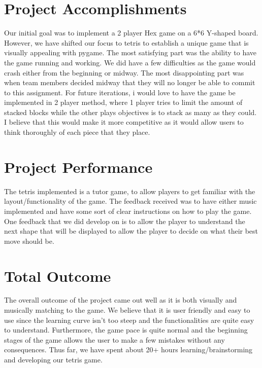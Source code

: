 \documentclass{article}
\begin{document}
\section{Project Accomplishments}
\quad Our initial goal was to implement a 2 player Hex game on a 6*6 Y-shaped board. However, we have shifted our focus to tetris to establish a unique game that is visually appealing with pygame. The most satisfying part was the ability to have the game running and working. We did have a few difficulties as the game would crash either from the beginning or midway. The most disappointing part was when team members decided midway that they will no longer be able to commit to this assignment. For future iterations, i would love to have the game be implemented in 2 player method, where 1 player tries to limit the amount of stacked blocks while the other plays objectives is to stack as many as they could. I believe that this would make it more competitive as it would allow users to think thoroughly of each piece that they place.
\section{Project Performance}
\quad The tetris implemented is a tutor game, to allow players to get familiar with the layout/functionality of the game. The feedback received was to have either music implemented and have some sort of clear instructions on how to play the game. One feedback that we did develop on is to allow the player to understand the next shape that will be displayed to allow the player to decide on what their best move should be.
\section{Total Outcome}
\quad The overall outcome of the project came out well as it is both visually and musically matching to the game. We believe that it is user friendly and easy to use since the learning curve isn’t too steep and the functionalities are quite easy to understand. Furthermore, the game pace is quite normal and the beginning stages of the game allows the user to make a few mistakes without any consequences. Thus far, we have spent about 20+ hours learning/brainstorming and developing our tetris game.
\newpage
\setcounter{section}{0}
\end{document}
